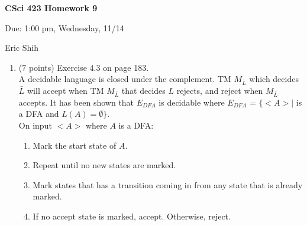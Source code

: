 \documentclass[11pt]{article}
\begin{document}
\begin{LARGE}
\centerline {\bf CSci 423 Homework 9}
\end{LARGE}
\vskip 0.25cm

\centerline{Due: 1:00 pm, Wednesday, 11/14}
\centerline{Eric Shih}

\begin{enumerate}
  \item (7 points) Exercise 4.3 on page 183. \\
    A decidable language is closed under the complement. TM $M_{\bar{L}}$ which decides $\bar{L}$ will accept when TM $M_{\bar{L}}$ that
    decides $L$ rejects, and reject when $M_{\bar{L}}$ accepts. It has been shown that $E_{DFA}$ is decidable where $E_{DFA}$ = $\{<A> | $
    is a DFA and $L(A)= \emptyset \}$. \\
    On input $<A>$ where $A$ is a DFA:
    \begin{enumerate}
     \item Mark the start state of $A$.
     \item Repeat until no new states are marked.
     \item Mark states that has a transition coming in from any state that is already marked.
     \item If no accept state is marked, accept. Otherwise, reject.
    \end{enumerate}


\end{enumerate}
\end{document}
